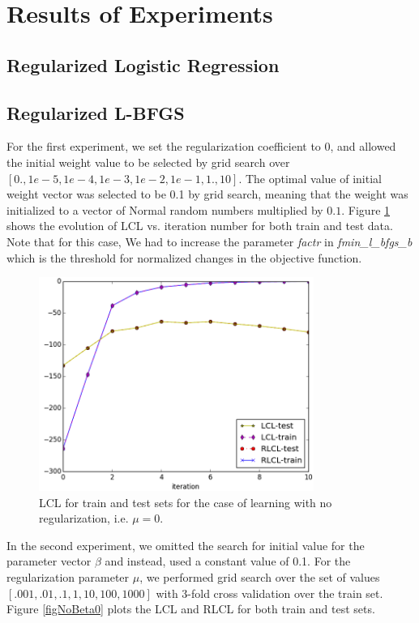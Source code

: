 \documentclass[twoside,12pt]{article}
\begin{document}
\section{Results of Experiments}
\subsection{Regularized Logistic Regression}
\subsection{ Regularized L-BFGS}
For the first experiment, we set the regularization coefficient to 0, and allowed the initial weight value to be selected by grid search over $[0.,1e-5,1e-4,1e-3,1e-2,1e-1,1.,10]$. The optimal value of initial weight vector was selected to be 0.1 by grid search, meaning that the weight was initialized to a vector of Normal random numbers multiplied by $0.1$. Figure \ref{figNoReg} shows the evolution of LCL vs. iteration number for both train and test data. Note that for this case, We had to increase the parameter {\it factr} in {\it fmin\_l\_bfgs\_b} which is the threshold for normalized changes in the objective function.
\begin{figure}[h!]
\label{figNoReg}
\centering
\includegraphics[width=0.8\textwidth]{noreg.png}
\caption{LCL for train and test sets for the case of learning with no regularization, i.e. $\mu=0$.}
\end{figure}
In the second experiment, we omitted the search for initial value for the parameter vector $\beta$ and instead, used a constant value of 0.1. For the regularization parameter $\mu$, we performed grid search over the set of values $[.001,.01,.1,1,10,100,1000]$ with 3-fold cross validation over the train set. Figure {\ref{figNoBeta0}} plots the LCL and RLCL for both train and test sets.
\end{document}
